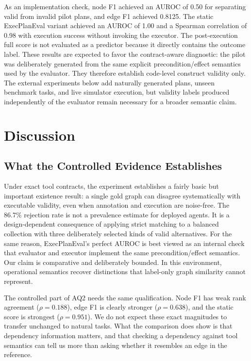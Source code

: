 \documentclass[10pt]{article}
\begin{document}
As an implementation check, node F1 achieved an AUROC of 0.50 for separating
valid from invalid pilot plans, and edge F1 achieved 0.8125. The static
ExecPlanEval variant achieved an AUROC of 1.00 and a Spearman correlation of
0.98 with execution success without invoking the executor. The post-execution
full score is not evaluated as a predictor because it directly contains the
outcome label. These results are
expected to favor the contract-aware diagnostic: the pilot was deliberately generated
from the same explicit precondition/effect semantics used by the evaluator.
They therefore establish code-level construct validity only. The external
experiments below add naturally generated plans, unseen benchmark tasks, and
live simulator execution, but validity labels produced independently of the
evaluator remain necessary for a broader semantic claim.

\section{Discussion}
\subsection{What the Controlled Evidence Establishes}
Under exact tool contracts, the experiment establishes a fairly basic but
important existence result: a single gold graph can disagree systematically
with executable validity, even when annotation and execution are noise-free.
The 86.7\% rejection rate is not a prevalence estimate for deployed agents. It
is a design-dependent consequence of applying strict matching to a
balanced collection with three deliberately selected kinds of valid
alternatives. For the same reason, ExecPlanEval's perfect AUROC is best viewed
as an internal check that evaluator and executor implement the same
precondition/effect semantics. Our claim is comparative and deliberately
bounded. In this environment, operational semantics recover distinctions that
label-only graph similarity cannot represent.

The controlled part of AQ2 needs the same qualification. Node F1 has weak rank agreement
($\rho=0.188$), edge F1 is clearly stronger ($\rho=0.638$), and the
static score is strongest ($\rho=0.951$). We do not expect these exact
magnitudes to transfer unchanged to natural tasks. What the comparison does
show is that dependency information matters, and that checking a dependency
against tool semantics can tell us more than asking whether it resembles an
edge in the reference.
\end{document}
